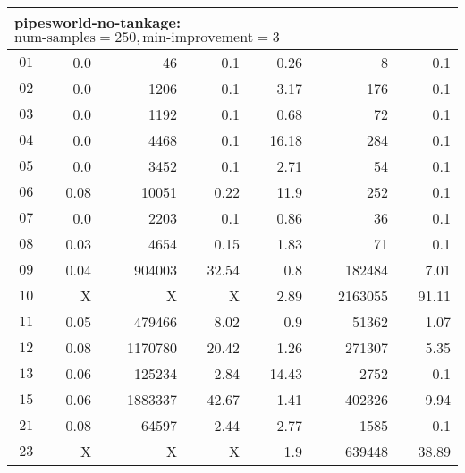 \begin{longtable}{|c||r|r|r||r|r|r|}
\multicolumn{7}{|l|}{pipesworld-no-tankage: $\text{num-samples}=250,\text{min-improvement}=3$}\\\hline
$01$ & 0.0 & 46 & 0.1 &0.26 & 8 & 0.1 \\\hline
$02$ & 0.0 & 1206 & 0.1 &3.17 & 176 & 0.1 \\\hline
$03$ & 0.0 & 1192 & 0.1 &0.68 & 72 & 0.1 \\\hline
$04$ & 0.0 & 4468 & 0.1 &16.18 & 284 & 0.1 \\\hline
$05$ & 0.0 & 3452 & 0.1 &2.71 & 54 & 0.1 \\\hline
$06$ & 0.08 & 10051 & 0.22 &11.9 & 252 & 0.1 \\\hline
$07$ & 0.0 & 2203 & 0.1 &0.86 & 36 & 0.1 \\\hline
$08$ & 0.03 & 4654 & 0.15 &1.83 & 71 & 0.1 \\\hline
$09$ & 0.04 & 904003 & 32.54 &0.8 & 182484 & 7.01 \\\hline
$10$ & X & X & X &2.89 & 2163055 & 91.11 \\\hline
$11$ & 0.05 & 479466 & 8.02 &0.9 & 51362 & 1.07 \\\hline
$12$ & 0.08 & 1170780 & 20.42 &1.26 & 271307 & 5.35 \\\hline
$13$ & 0.06 & 125234 & 2.84 &14.43 & 2752 & 0.1 \\\hline
$15$ & 0.06 & 1883337 & 42.67 &1.41 & 402326 & 9.94 \\\hline
$21$ & 0.08 & 64597 & 2.44 &2.77 & 1585 & 0.1 \\\hline
$23$ & X & X & X &1.9 & 639448 & 38.89 \\\hline


\end{longtable}
